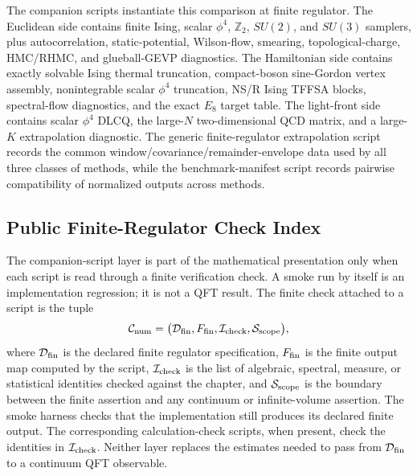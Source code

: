 The companion scripts instantiate this comparison at finite regulator.  The
Euclidean side contains finite Ising, scalar \(\phi^4\), \(\mathbb Z_2\),
\(SU(2)\), and \(SU(3)\) samplers, plus autocorrelation,
static-potential, Wilson-flow, smearing, topological-charge, HMC/RHMC, and
glueball-GEVP diagnostics.  The Hamiltonian side contains exactly solvable
Ising thermal truncation, compact-boson sine-Gordon vertex assembly,
nonintegrable scalar \(\phi^4\) truncation, NS/R Ising TFFSA blocks,
spectral-flow diagnostics, and the exact \(E_8\) target table.  The
light-front side contains scalar \(\phi^4\) DLCQ, the large-\(N\)
two-dimensional QCD matrix, and a large-\(K\) extrapolation diagnostic.  The
generic finite-regulator extrapolation script records the common
window/covariance/remainder-envelope data used by all three classes of
methods, while the benchmark-manifest script records pairwise compatibility
of normalized outputs across methods.

\subsection*{Public Finite-Regulator Check Index}
\label{subsec:public-finite-regulator-check-index}

The companion-script layer is part of the mathematical presentation only
when each script is read through a finite verification check.  A smoke run by itself
is an implementation regression; it is not a QFT result.  The finite
check attached to a script is the tuple
\[
  \mathcal C_{\rm num}
  =
  \bigl(
    \mathcal D_{\rm fin},
    F_{\rm fin},
    \mathcal I_{\rm check},
    \mathcal S_{\rm scope}
  \bigr),
\]
where \(\mathcal D_{\rm fin}\) is the declared finite regulator specification,
\(F_{\rm fin}\) is the finite output map computed by the script,
\(\mathcal I_{\rm check}\) is the list of algebraic, spectral, measure, or
statistical identities checked against the chapter, and
\(\mathcal S_{\rm scope}\) is the boundary between the finite assertion and
any continuum or infinite-volume assertion.  The smoke harness checks that
the implementation still produces its declared finite output.  The
corresponding calculation-check scripts, when present, check the identities
in \(\mathcal I_{\rm check}\).  Neither layer replaces the estimates needed
to pass from \(\mathcal D_{\rm fin}\) to a continuum QFT observable.

